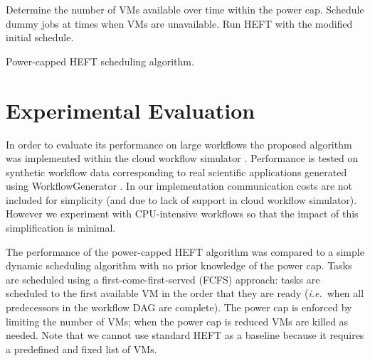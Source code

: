 \documentclass[10pt, conference, compsocconf]{IEEEtran} %
\newcommand{\ie}{\textit{i.e.}\ }
\begin{document}
\begin{algorithm}
  \begin{algorithmic}[1]
    \State Determine the number of VMs available over time within the power cap.
    \State Schedule dummy jobs at times when VMs are unavailable.
    \State Run HEFT with the modified initial schedule.


  \end{algorithmic}
  \caption{Power-capped HEFT scheduling algorithm.}
  \label{alg:power-capped-heft}
\end{algorithm}

\section{Experimental Evaluation}

In order to evaluate its performance on large workflows the proposed algorithm was implemented within the cloud workflow simulator \cite{CloudWorkflowSimulator,malawski2012cost}.
Performance is tested on synthetic workflow data corresponding to real scientific applications generated using WorkflowGenerator \cite{WorkflowGenerator,Silva2014WorkflowGenerator}.
In our implementation communication costs are not included for simplicity (and due to lack of support in cloud workflow simulator).
However we experiment with CPU-intensive workflows \cite{Bharathi2008} so that the impact of this simplification is minimal.

The performance of the power-capped HEFT algorithm was compared to a simple dynamic scheduling algorithm with no prior knowledge of the power cap.
Tasks are scheduled using a first-come-first-served (FCFS) approach: tasks are scheduled to the first available VM in the order that they are ready (\ie when all predecessors in the workflow DAG are complete).
The power cap is enforced by limiting the number of VMs; when the power cap is reduced VMs are killed as needed.
Note that we cannot use standard HEFT as a baseline because it requires a predefined and fixed list of VMs.
\end{document}
